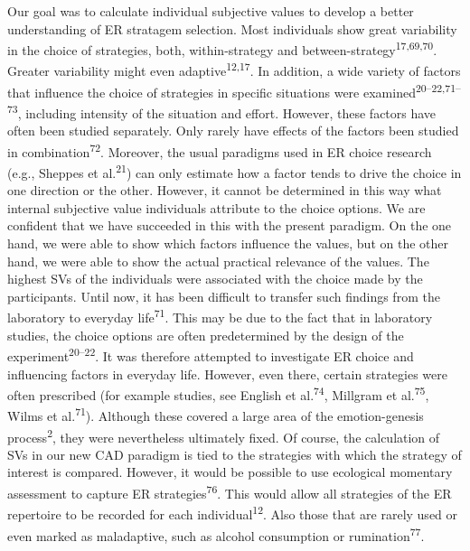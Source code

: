 \documentclass[
  man,floatsintext]{apa6}
\begin{document}
Our goal was to calculate individual subjective values to develop a better understanding of ER stratagem selection.
Most individuals show great variability in the choice of strategies, both, within-strategy and between-strategy\textsuperscript{17,69,70}.
Greater variability might even adaptive\textsuperscript{12,17}.
In addition, a wide variety of factors that influence the choice of strategies in specific situations were examined\textsuperscript{20--22,71--73}, including intensity of the situation and effort.
However, these factors have often been studied separately.
Only rarely have effects of the factors been studied in combination\textsuperscript{72}.
Moreover, the usual paradigms used in ER choice research (e.g., Sheppes et al.\textsuperscript{21}) can only estimate how a factor tends to drive the choice in one direction or the other.
However, it cannot be determined in this way what internal subjective value individuals attribute to the choice options.
We are confident that we have succeeded in this with the present paradigm.
On the one hand, we were able to show which factors influence the values, but on the other hand, we were able to show the actual practical relevance of the values.
The highest SVs of the individuals were associated with the choice made by the participants.
Until now, it has been difficult to transfer such findings from the laboratory to everyday life\textsuperscript{71}.
This may be due to the fact that in laboratory studies, the choice options are often predetermined by the design of the experiment\textsuperscript{20--22}.
It was therefore attempted to investigate ER choice and influencing factors in everyday life.
However, even there, certain strategies were often prescribed (for example studies, see English et al.\textsuperscript{74}, Millgram et al.\textsuperscript{75}, Wilms et al.\textsuperscript{71}).
Although these covered a large area of the emotion-genesis process\textsuperscript{2}, they were nevertheless ultimately fixed.
Of course, the calculation of SVs in our new CAD paradigm is tied to the strategies with which the strategy of interest is compared.
However, it would be possible to use ecological momentary assessment to capture ER strategies\textsuperscript{76}.
This would allow all strategies of the ER repertoire to be recorded for each individual\textsuperscript{12}.
Also those that are rarely used or even marked as maladaptive, such as alcohol consumption or rumination\textsuperscript{77}.
\end{document}
